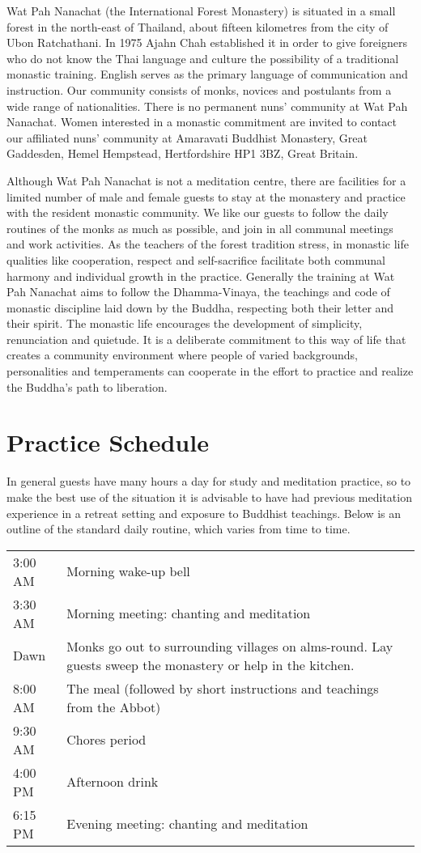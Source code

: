 
Wat Pah Nanachat (the International Forest Monastery) is situated in a
small forest in the north-east of Thailand, about fifteen kilometres
from the city of Ubon Ratchathani. In 1975 Ajahn Chah established it in
order to give foreigners who do not know the Thai language and culture
the possibility of a traditional monastic training. English serves as
the primary language of communication and instruction. Our community
consists of monks, novices and postulants from a wide range of
nationalities. There is no permanent nuns' community at Wat Pah
Nanachat. Women interested in a monastic commitment are invited to
contact our affiliated nuns' community at Amaravati Buddhist Monastery,
Great Gaddesden, Hemel Hempstead, Hertfordshire HP1 3BZ, Great Britain.

Although Wat Pah Nanachat is not a meditation centre, there are
facilities for a limited number of male and female guests to stay at the
monastery and practice with the resident monastic community. We like our
guests to follow the daily routines of the monks as much as possible,
and join in all communal meetings and work activities. As the teachers
of the forest tradition stress, in monastic life qualities like
cooperation, respect and self-sacrifice facilitate both communal harmony
and individual growth in the practice. Generally the training at Wat Pah
Nanachat aims to follow the Dhamma-Vinaya, the teachings and code of
monastic discipline laid down by the Buddha, respecting both their
letter and their spirit. The monastic life encourages the development of
simplicity, renunciation and quietude. It is a deliberate commitment to
this way of life that creates a community environment where people of
varied backgrounds, personalities and temperaments can cooperate in the
effort to practice and realize the Buddha's path to liberation.

\section{Practice Schedule}

In general guests have many hours a day for study and meditation
practice, so to make the best use of the situation it is advisable to
have had previous meditation experience in a retreat setting and
exposure to Buddhist teachings.  Below is an outline of the standard
daily routine, which varies from time to time.

\begin{tabular}{l p{80mm}}
3:00 AM & Morning wake-up bell\\
3:30 AM & Morning meeting: chanting and meditation\\
Dawn & Monks go out to surrounding villages on alms-round. Lay guests sweep the monastery or help in the kitchen.\\
8:00 AM & The meal (followed by short instructions and teachings from the Abbot)\\
9:30 AM & Chores period\\
4:00 PM & Afternoon drink\\
6:15 PM & Evening meeting: chanting and meditation\\
\end{tabular}

